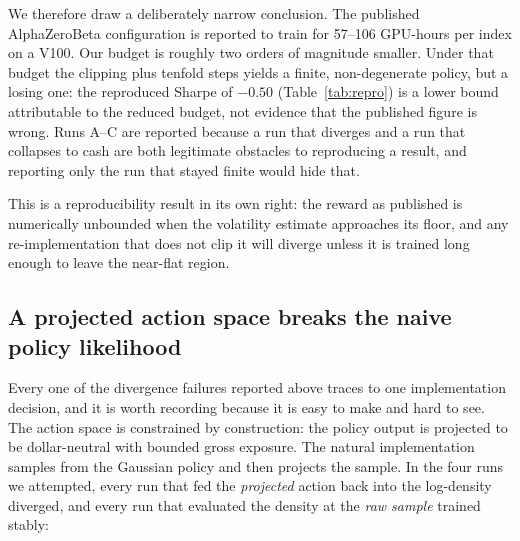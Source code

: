 \documentclass[conference]{IEEEtran}
\begin{document}
We therefore draw a deliberately narrow conclusion. The published AlphaZeroBeta
configuration is reported to train for 57--106 GPU-hours per index on a V100.
Our budget is roughly two orders of magnitude smaller. Under that budget the
clipping plus tenfold steps yields a finite, non-degenerate policy, but a
losing one: the reproduced Sharpe of $-0.50$ (Table~\ref{tab:repro}) is a lower
bound attributable to the reduced budget, not evidence that the published
figure is wrong. Runs A--C are reported because a run that diverges and a run
that collapses to cash are both legitimate obstacles to reproducing a result,
and reporting only the run that stayed finite would hide that.

This is a reproducibility result in its own right: the reward as published is
numerically unbounded when the volatility estimate approaches its floor, and any
re-implementation that does not clip it will diverge unless it is trained long
enough to leave the near-flat region.


\subsection{A projected action space breaks the naive policy likelihood}
\label{sec:projection-bug}

Every one of the divergence failures reported above traces to one implementation
decision, and it is worth recording because it is easy to make and hard to see.
The action space is constrained by construction: the policy output is projected to
be dollar-neutral with bounded gross exposure. The natural implementation samples
from the Gaussian policy and then projects the sample. In the four runs we
attempted, every run that fed the \emph{projected} action back into the log-density
diverged, and every run that evaluated the density at the \emph{raw sample}
trained stably:

\begin{table}[t]
\centering
\footnotesize
{}
\caption{The single change that made the reproduction train. The projection is a deterministic map, so it regularly moves a sample far into the tail of the density being optimised; the clipped ratio then diverges.}
\label{tab:projbug}
\end{table}
\end{document}
